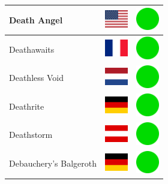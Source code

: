 \documentclass[12pt, a4paper, twoside]{report}
\begin{document}
\begin{center}
\begin{longtable}{|p{5cm}|p{2cm}|p{2cm}|}
 Death Angel                                                & \includegraphics[width=1cm]{../img/flags/us} &   \includegraphics[width=1cm]{../likes/y} \\ \hline
 Deathawaits                                                & \includegraphics[width=1cm]{../img/flags/fr} &   \includegraphics[width=1cm]{../likes/y} \\ \hline
 Deathless Void                                             & \includegraphics[width=1cm]{../img/flags/nl} &   \includegraphics[width=1cm]{../likes/y} \\ \hline
 Deathrite                                                  & \includegraphics[width=1cm]{../img/flags/de} &   \includegraphics[width=1cm]{../likes/y} \\ \hline
 Deathstorm                                                 & \includegraphics[width=1cm]{../img/flags/at} &   \includegraphics[width=1cm]{../likes/y} \\ \hline
 Debauchery's Balgeroth                                     & \includegraphics[width=1cm]{../img/flags/de} &   \includegraphics[width=1cm]{../likes/y} \\ \hline

\end{longtable}
\end{center}
\end{document}
